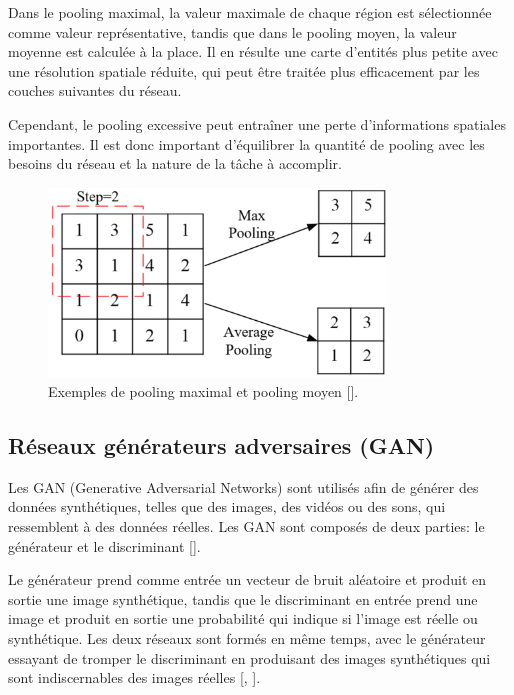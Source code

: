 \medskip
Dans le pooling maximal, la valeur maximale de chaque région est sélectionnée comme valeur représentative, tandis que dans le pooling moyen, la valeur moyenne est calculée à la place. Il en résulte une carte d'entités plus petite avec une résolution spatiale réduite, qui peut être traitée plus efficacement par les couches suivantes du réseau.

\medskip
Cependant, le pooling excessive peut entraîner une perte d'informations spatiales importantes. Il est donc important d'équilibrer la quantité de pooling avec les besoins du réseau et la nature de la tâche à accomplir.

\begin{figure}[hbt!]
	\centering
	\includegraphics[width=9cm]{images_pfe/pooling.png}
	\caption{Exemples de pooling maximal et pooling moyen [\cite{hu_wu_xu_lai_xia_2022}].}
	\label{fig:pooling}
\end{figure}
\FloatBarrier
\medskip

\subsection{Réseaux générateurs adversaires (GAN)}
Les GAN (Generative Adversarial Networks) sont utilisés afin de générer des
données synthétiques, telles que des images, des vidéos ou des sons, qui
ressemblent à des données réelles. Les GAN sont composés de deux parties: le
générateur et le discriminant
	[\cite{goodfellow_pouget-abadie_mirza_xu_warde-farley_ozair_courville_bengio_2020}].

\medskip
Le générateur prend comme entrée un vecteur de bruit aléatoire et produit en sortie une image synthétique, tandis que le discriminant en entrée prend une image et produit en sortie une probabilité qui indique si l'image est réelle ou synthétique. Les deux réseaux sont formés en même temps, avec le générateur essayant de tromper le discriminant en produisant des images synthétiques qui sont indiscernables des images réelles [\cite{goodfellow_pouget-abadie_mirza_xu_warde-farley_ozair_courville_bengio_2020}, \cite{feng_feng_chen_cao_zhang_jiao_yu_2020}].

